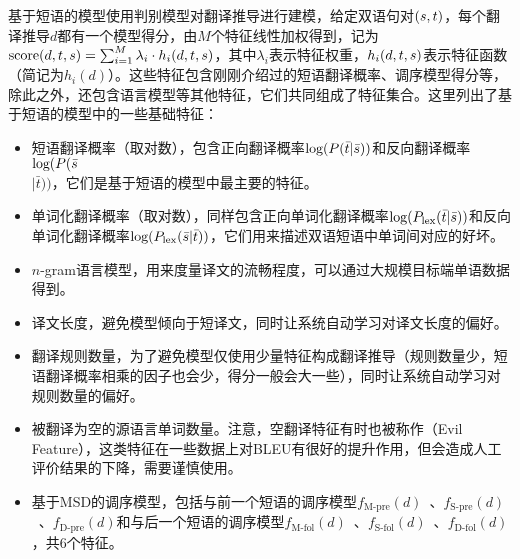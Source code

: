 \parinterval 基于短语的模型使用判别模型对翻译推导进行建模，给定双语句对$({s},{t})$，每个翻译推导$d$都有一个模型得分，由$M$个特征线性加权得到，记为$\textrm{score}(d,{t},{s}) = \sum_{i=1}^{M} \lambda_i \cdot h_i (d,{t},{s})$，其中$\lambda_i$表示特征权重，$h_i (d,{t},{s})$表示特征函数（简记为$h_i (d)$）。这些特征包含刚刚介绍过的短语翻译概率、调序模型得分等，除此之外，还包含语言模型等其他特征，它们共同组成了特征集合。这里列出了基于短语的模型中的一些基础特征：

\begin{itemize}
\vspace{0.5em}
\item 短语翻译概率（取对数），包含正向翻译概率$\textrm{log}({P}(\bar{t}|\bar{s}))$和反向翻译概率$\textrm{log}({P}(\bar{s}$\\$|\bar{t}))$，它们是基于短语的模型中最主要的特征。
\vspace{0.5em}
\item 单词化翻译概率（取对数），同样包含正向单词化翻译概率$\textrm{log}({P}_{\textrm{lex}}(\bar{t}|\bar{s}))$和反向单词化翻译概率$\textrm{log}({P}_{\textrm{lex}}(\bar{s}|\bar{t}))$，它们用来描述双语短语中单词间对应的好坏。
\item $n$-gram语言模型，用来度量译文的流畅程度，可以通过大规模目标端单语数据得到。
\vspace{0.5em}
\item 译文长度，避免模型倾向于短译文，同时让系统自动学习对译文长度的偏好。
\vspace{0.5em}
\item 翻译规则数量，为了避免模型仅使用少量特征构成翻译推导（规则数量少，短语翻译概率相乘的因子也会少，得分一般会大一些），同时让系统自动学习对规则数量的偏好。
\vspace{0.5em}
\item 被翻译为空的源语言单词数量。注意，空翻译特征有时也被称作{\small{}}（Evil Feature），这类特征在一些数据上对BLEU有很好的提升作用，但会造成人工评价结果的下降，需要谨慎使用。
\vspace{0.5em}
\item 基于MSD的调序模型，包括与前一个短语的调序模型$f_{\textrm{M-pre}}(d)$\ 、$f_{\textrm{S-pre}}(d)$\ 、$f_{\textrm{D-pre}}(d)$和与后一个短语的调序模型$f_{\textrm{M-fol}}(d)$\ 、$f_{\textrm{S-fol}}(d)$\ 、$f_{\textrm{D-fol}}(d)$，共6个特征。
\vspace{0.5em}
\end{itemize}


